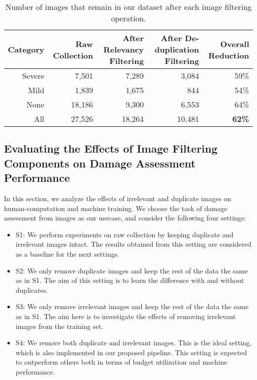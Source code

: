 \documentclass{iscram}
\begin{document}
\begin{table}[htb]
\caption{Number of images that remain in our dataset after each image filtering operation.
}
\centering
\begin{tabular}{rrrrr}
\toprule
Category&Raw Collection&After Relevancy Filtering&After De-duplication Filtering&Overall Reduction\\
\midrule
 Severe & 7,501 & 7,289 & 3,084 & 59\%\\
 Mild   & 1,839 & 1,675 & 844 & 54\%\\
 None   & 18,186 & 9,300 & 6,553 & 64\%\\
\midrule
All & 27,526 & 18,264 & 10,481 & \textbf{62\%}\\
\bottomrule
\end{tabular}
\label{tbl:data_after_filtering}
\end{table}\subsection{Evaluating the Effects of Image Filtering Components on Damage Assessment Performance}

In this section, we analyze the effects of irrelevant and duplicate images on human-computation and machine training. We choose the task of damage assessment from images as our usecase, and consider the following four settings:

\begin{itemize}
\setlength\itemsep{0em}
\item S1: We perform experiments on raw collection by keeping duplicate and irrelevant images intact.
The results obtained from this setting are considered as a baseline for the next settings.

\item S2: We only remove duplicate images and keep the rest of the data the same as in S1. The aim of this setting is to learn the difference with and without duplicates.

\item S3: We only remove irrelevant images and keep the rest of the data the same as in S1.
The aim here is to investigate the effects of removing irrelevant images from the training set.

\item S4: We remove both duplicate and irrelevant images. This is the ideal setting, which is also implemented in our proposed pipeline. This setting is expected to outperform others both in terms of budget utilization and machine performance.
\end{itemize}
\end{document}
